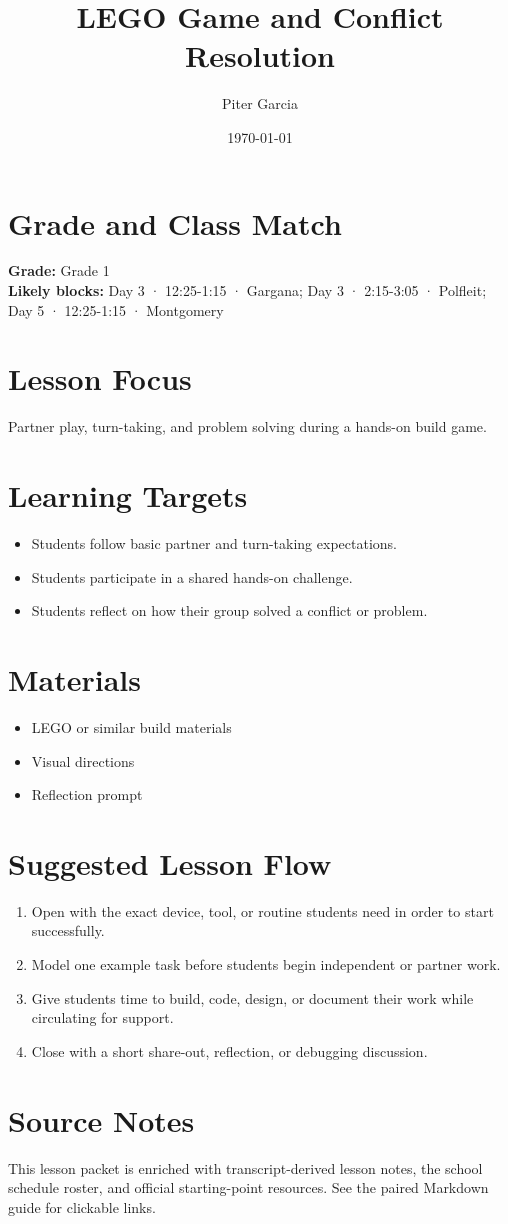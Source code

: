 \documentclass[11pt]{article}
\title{LEGO Game and Conflict Resolution}
\author{Piter Garcia}
\date{\today}
\begin{document}
\maketitle

\section*{Grade and Class Match}
\textbf{Grade:} Grade 1\\
\textbf{Likely blocks:} Day 3 · 12:25-1:15 · Gargana; Day 3 · 2:15-3:05 · Polfleit; Day 5 · 12:25-1:15 · Montgomery

\section*{Lesson Focus}
Partner play, turn-taking, and problem solving during a hands-on build game.

\section*{Learning Targets}
\begin{itemize}[leftmargin=*]
\item Students follow basic partner and turn-taking expectations.
\item Students participate in a shared hands-on challenge.
\item Students reflect on how their group solved a conflict or problem.
\end{itemize}

\section*{Materials}
\begin{itemize}[leftmargin=*]
\item LEGO or similar build materials
\item Visual directions
\item Reflection prompt
\end{itemize}

\section*{Suggested Lesson Flow}
\begin{enumerate}[leftmargin=*]
\item Open with the exact device, tool, or routine students need in order to start successfully.
\item Model one example task before students begin independent or partner work.
\item Give students time to build, code, design, or document their work while circulating for support.
\item Close with a short share-out, reflection, or debugging discussion.
\end{enumerate}

\section*{Source Notes}
This lesson packet is enriched with transcript-derived lesson notes, the school schedule roster, and official starting-point resources. See the paired Markdown guide for clickable links.



\end{document}
